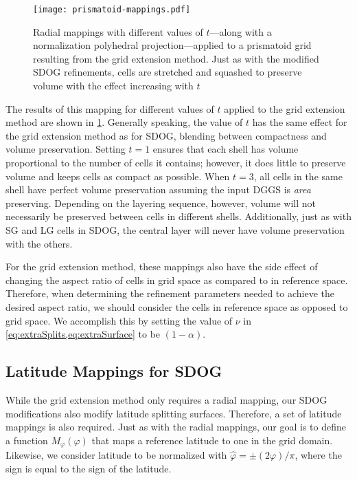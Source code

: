 \begin{figure}[ht!]
	\centering
	\texttt{[image: prismatoid-mappings.pdf]}
	\caption[Radial mappings applied to the grid extension method]{
		Radial mappings with different values of $t$---along with a normalization polyhedral projection---applied to a prismatoid grid resulting from the grid extension method.
		Just as with the modified SDOG refinements, cells are stretched and squashed to preserve volume with the effect increasing with $t$
	}
	\label{fig:prismatoid-mappings}
\end{figure}


The results of this mapping for different values of $t$ applied to the grid extension method are shown in \cref{fig:prismatoid-mappings}.
Generally speaking, the value of $t$ has the same effect for the grid extension method as for SDOG, blending between compactness and volume preservation.
Setting $t=1$ ensures that each shell has volume proportional to the number of cells it contains; however, it does little to preserve volume and keeps cells as compact as possible.
When $t=3$, all cells in the same shell have perfect volume preservation assuming the input DGGS is \textit{area} preserving.
Depending on the layering sequence, however, volume will not necessarily be preserved between cells in different shells.
Additionally, just as with SG and LG cells in SDOG, the central layer will never have volume preservation with the others.


For the grid extension method, these mappings also have the side effect of changing the aspect ratio of cells in grid space as compared to in reference space.
Therefore, when determining the refinement parameters needed to achieve the desired aspect ratio, we should consider the cells in reference space as opposed to grid space.
We accomplish this by setting the value of $\nu$ in \cref{eq:extraSplits,eq:extraSurface} to be $(1 - \alpha)$.


\subsection{Latitude Mappings for SDOG} \label{chap:6:latitude}
While the grid extension method only requires a radial mapping, our SDOG modifications also modify latitude splitting surfaces.
Therefore, a set of latitude mappings is also required.
Just as with the radial mappings, our goal is to define a function $M_\varphi(\varphi)$ that maps a reference latitude to one in the grid domain. Likewise, we consider latitude to be normalized with $\hat{\varphi} = \pm (2\varphi) / \pi$, where the sign is equal to the sign of the latitude.


